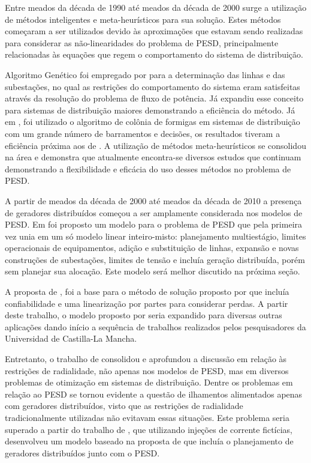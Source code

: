 Entre meados da década de 1990 até meados da década de 2000 surge a utilização de métodos inteligentes e meta-heurísticos para sua solução. Estes métodos começaram a ser utilizados devido às aproximações que estavam sendo realizadas para considerar as não-linearidades do problema de \ac{PESD}, principalmente relacionadas às equações que regem o comportamento do sistema de distribuição.

Algoritmo Genético foi empregado por  para a determinação das linhas e das subestações, no qual as restrições do comportamento do sistema eram satisfeitas através da resolução do problema de fluxo de potência. Já  expandiu esse conceito para sistemas de distribuição maiores demonstrando a eficiência do método. Já em , foi utilizado o algoritmo de colônia de formigas em sistemas de distribuição com um grande número de barramentos e decisões, os resultados tiveram a eficiência próxima aos de . A utilização de métodos meta-heurísticos se consolidou na área e  demonstra que atualmente encontra-se diversos estudos que continuam demonstrando a flexibilidade e eficácia do uso desses métodos no problema de \ac{PESD}.


A partir de meados da década de 2000 até meados da década de 2010 a presença de geradores distribuídos começou a ser amplamente considerada nos modelos de \ac{PESD}. Em  foi proposto um modelo para o problema de \ac{PESD} que pela primeira vez unia em um só modelo linear inteiro-misto: planejamento multiestágio, limites operacionais de equipamentos, adição e substituição de linhas, expansão e novas construções de subestações, limites de tensão e incluía geração distribuída, porém sem planejar sua alocação. Este modelo será melhor discutido na próxima seção.

A proposta de , foi a base para o método de solução proposto por  que incluía confiabilidade e uma linearização por partes para considerar perdas. A partir deste trabalho, o modelo proposto por  seria expandido para diversas outras aplicações dando início a sequência de trabalhos realizados pelos pesquisadores da Universidad de Castilla-La Mancha.


Entretanto, o trabalho de  consolidou e aprofundou a discussão em relação às restrições de radialidade, não apenas nos modelos de \ac{PESD}, mas em diversos problemas de otimização em sistemas de distribuição. Dentre os problemas em relação ao \ac{PESD} se tornou evidente a questão de ilhamentos alimentados apenas com geradores distribuídos, visto que as restrições de radialidade tradicionalmente utilizadas não evitavam essas situações. Este problema seria superado a partir do trabalho de , que utilizando injeções de corrente fictícias, desenvolveu um modelo baseado na proposta de  que incluía o planejamento de geradores distribuídos junto com o \ac{PESD}.

